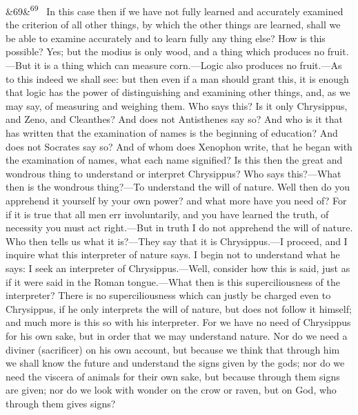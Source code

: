 \documentclass[12pt]{article}
\newcommand{\para}[1][]{\par\noindent\ifx&#1&\else\textsuperscript{\footnotesize #1}~\fi}
\begin{document}
\para[69] In this case then if we have not fully learned and accurately examined the criterion of all other things, by which the other things are learned, shall we be able to examine accurately and to learn fully any thing else? How is this possible? Yes; but the modius is only wood, and a thing which produces no fruit.—But it is a thing which can measure corn.—Logic also produces no fruit.—As to this indeed we shall see: but then even if a man should grant this, it is enough that logic has the power of distinguishing and examining other things, and, as we may say, of measuring and weighing them. Who says this? Is it only Chrysippus, and Zeno, and Cleanthes? And does not Antisthenes say so? And who is it that has written that the examination of names is the beginning of education? And does not Socrates say so? And of whom does Xenophon write, that he began with the examination of names, what each name signified? Is this then the great and wondrous thing to understand or interpret Chrysippus? Who says this?—What then is the wondrous thing?—To understand the will of nature. Well then do you apprehend it yourself by your own power? and what more have you need of? For if it is true that all men err involuntarily, and you have learned the truth, of necessity you must act right.—But in truth I do not apprehend the will of nature. Who then tells us what it is?—They say that it is Chrysippus.—I proceed, and I inquire what this interpreter of nature says. I begin not to understand what he says: I seek an interpreter of Chrysippus.—Well, consider how this is said, just as if it were said in the Roman tongue.—What then is this superciliousness of the interpreter? There is no superciliousness which can justly be charged even to Chrysippus, if he only interprets the will of nature, but does not follow it himself; and much more is this so with his interpreter. For we have no need of Chrysippus for his own sake, but in order that we may understand nature. Nor do we need a diviner (sacrificer) on his own account, but because we think that through him we shall know the future and understand the signs given by the gods; nor do we need the viscera of animals for their own sake, but because through them signs are given; nor do we look with wonder on the crow or raven, but on God, who through them gives signs?
\end{document}
